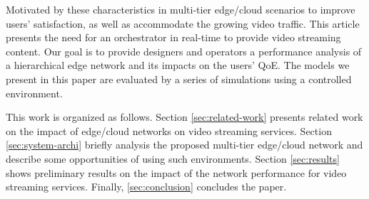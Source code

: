 Motivated by these characteristics in multi-tier edge/cloud scenarios to improve users' satisfaction, as well as accommodate the growing video traffic. This article presents the need for an orchestrator in real-time to provide video streaming content.
Our goal is to provide designers and operators a performance analysis of a hierarchical edge network and its impacts on the users' QoE. The models we present in this paper are evaluated by a series of simulations using a controlled environment.

This work is organized as follows.
Section \ref{sec:related-work} presents related work on the impact of edge/cloud networks on video streaming services.
Section \ref{sec:system-archi} briefly analysis the proposed multi-tier edge/cloud network and describe some opportunities of using such environments.
Section \ref{sec:results} shows preliminary results on the impact of the network performance for video streaming services.
Finally, \ref{sec:conclusion} concludes the paper.